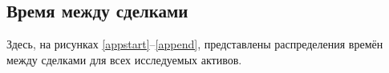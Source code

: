 \begin{appendices}
	

        \section{Время между сделками} \label{timedistr}
        Здесь, на рисунках \ref{appstart}--\ref{append}, представлены распределения времён между сделками для всех исследуемых активов.


\end{appendices}
